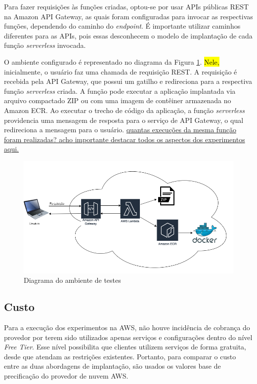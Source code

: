 \documentclass[10pt,conference]{IEEEtran}
\begin{document}
Para fazer requisições às funções criadas, optou-se por usar APIs públicas REST na Amazon API Gateway, as quais foram configuradas para invocar as respectivas funções, dependendo do caminho do \textit{endpoint}. É importante utilizar caminhos diferentes para as APIs, pois essas desconhecem o modelo de implantação de cada função \textit{serverless} invocada.

O ambiente configurado é representado no diagrama da Figura \ref{fig:env_diagram}. \hl{Nele,} inicialmente, o usuário faz uma chamada de requisição REST. A requisição é recebida pela API Gateway, que possui um gatilho e redireciona para a respectiva função \textit{serverless} criada. A função pode executar a aplicação implantada via arquivo compactado ZIP ou com uma imagem de contêiner armazenada no Amazon ECR. Ao executar o trecho de código da aplicação, a função \textit{serverless} providencia uma mensagem de resposta para o serviço de API Gateway, o qual redireciona a mensagem para o usuário. \ul{quantas execuções da mesma função foram realizadas? acho importante destacar todos os aspectos dos experimentos aqui.}

\begin{figure}[htbp]
    \centering 
    \includegraphics [width=\linewidth]{images/environment-diagram-PT.png}
    \par
    \caption{Diagrama do ambiente de testes}
    \label{fig:env_diagram}
\end{figure}

\subsection{Custo}
\label{subsec:cost}

Para a execução dos experimentos na AWS, não houve incidência de cobrança do provedor por terem sido utilizados apenas serviços e configurações dentro do nível \textit{Free Tier}. Esse nível possibilita que clientes utilizem serviços de forma gratuita, desde que atendam as restrições existentes. Portanto, para comparar o custo entre as duas abordagens de implantação, são usados os valores base de precificação do provedor de nuvem AWS.
\end{document}
